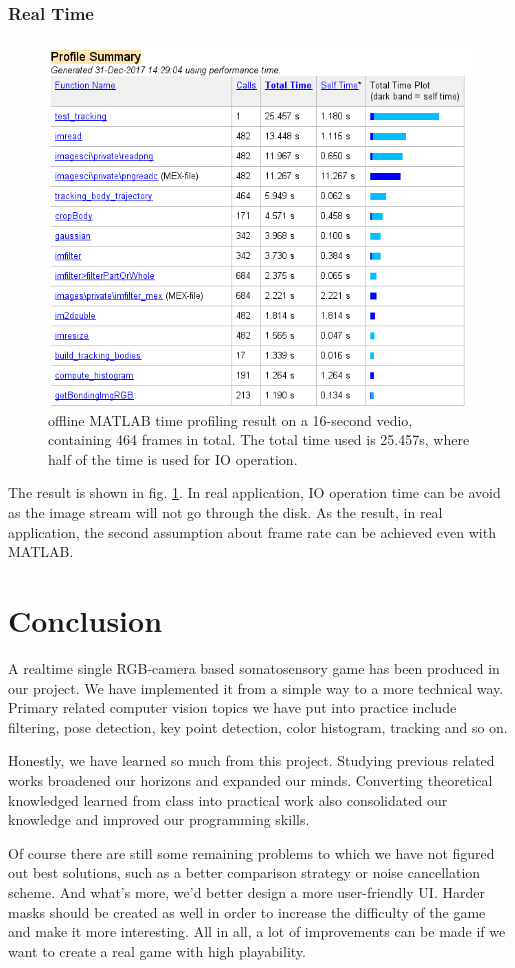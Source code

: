 \documentclass[11pt,twocolumn,letterpaper]{article}
\begin{document}
\subsubsection{Real Time}
\begin{figure}[h]
      \centering
      \includegraphics[width=0.8\linewidth]{./Pic/time.png}
      \caption{offline MATLAB time profiling result on a 16-second vedio, containing 464 frames in total. The total time used is 25.457s, where half of the time is used for IO operation.}
\label{timing}      
\end{figure}
 The result is shown in fig. \ref{timing}.  In real application, IO operation time can be avoid as the image stream will not go through the disk. As the result, in real application, the second assumption about frame rate can be achieved even with MATLAB.
\section{Conclusion}
    \par A realtime single RGB-camera based somatosensory game has been produced in our project. We have implemented it from a simple way to a more technical way. Primary related computer vision topics we have put into practice include filtering, pose detection, key point detection, color histogram, tracking and so on.
    \par Honestly, we have learned so much from this project. Studying previous related works broadened our horizons and expanded our minds. Converting theoretical knowledged learned from class into practical work also consolidated our knowledge and improved our programming skills.
    \par Of course there are still some remaining problems to which we have not figured out best solutions, such as a better comparison strategy or noise cancellation scheme. And what's more, we'd better design a more user-friendly UI. Harder masks should be created as well in order to increase the difficulty of the game and make it more interesting. All in all, a lot of improvements can be made if we want to create a real game with high playability.

{\small


}
\end{document}
